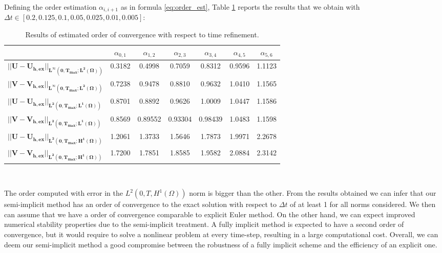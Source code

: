 Defining the order estimation $ \alpha_{i,i+1}$ as in formula \eqref{eq:order_est}, Table \ref{tab:res_conv} reports the results that we obtain with $\Delta t \in [0.2, 0.125, 0.1, 0.05, 0.025, 0.01, 0.005]$:
\begin{table}
    \centering
    \begin{tabular}{|p{12em}|c c c c c c|}
    \hline
     & \textbf{$\alpha_{0,1}$} & $\alpha_{1,2}$ & $\alpha_{2,3}$ &  $\alpha_{3,4}$ & $\alpha_{4,5}$ & $\alpha_{5,6}$ \T\B\\
    \hline \hline
    $\mathbf{||U-U_{h,ex}||_{L^{\infty}\left(0, T_{max}; L^2\left(\Omega\right) \right)}}$ & 0.3182 & 0.4998 & 0.7059 & 0.8312 & 0.9596 & 1.1123 \T\B\\
    $\mathbf{||V-V_{h,ex}||_{L^{\infty}\left(0, T_{max}; L^2\left(\Omega\right) \right)} }$ & 0.7238 & 0.9478 & 0.8810 & 0.9632 & 1.0410 & 1.1565 \T\B\\
    \hline
    $\mathbf{||U-U_{h,ex}||_{L^2\left(0, T_{max}; L^1\left(\Omega\right) \right)}}$ & 0.8701 &0.8892  & 0.9626 & 1.0009 & 1.0447 & 1.1586 \T\B\\
    $\mathbf{||V-V_{h,ex}||_{L^2\left(0, T_{max}; L^1\left(\Omega\right) \right)}}$ & 0.8569 & 0.89552 & 0.93304 & 0.98439 & 1.0483 &1.1598 \T\B\\
    \hline
    $\mathbf{||U-U_{h,ex}||_{L^2\left(0, T_{max}; H^1\left(\Omega\right) \right)}}$ & 1.2061 & 1.3733 & 1.5646 & 1.7873 &1.9971 & 2.2678 \T\B\\
    $\mathbf{||V-V_{h,ex}||_{L^2\left(0, T_{max}; H^1\left(\Omega\right) \right)}}$ & 1.7200 & 1.7851 & 1.8585 & 1.9582 & 2.0884 & 2.3142 \T\B\\
    \hline
    \end{tabular}
    \\[10pt]
    \caption{Results of estimated order of convergence with respect to time refinement.}
    \label{tab:res_conv}
\end{table}

The order computed with error in the $L^2\left(0, T, H^1 \left(\Omega\right)\right)$ norm is bigger than the other. From the results obtained we can infer that our semi-implicit method has an order of convergence to the exact solution with respect to $\Delta t$ of at least 1 for all norms considered. We then can assume that we have a order of convergence comparable to explicit Euler method. On the other hand, we can expect improved numerical stability properties due to the semi-implicit treatment.
A fully implicit method is expected to have a second order of convergence, but it would require to solve a nonlinear problem at every time-step, resulting in a large computational cost. Overall, we can deem our semi-implicit method a good compromise between the robustness of a fully implicit scheme and the efficiency of an explicit one.

